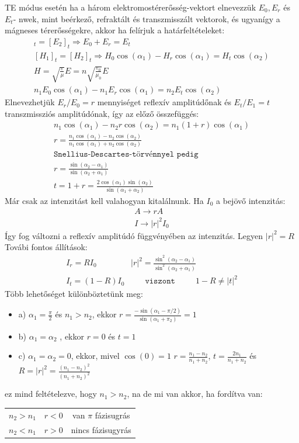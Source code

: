\documentclass{article}
\begin{document}
TE módus esetén ha a három elektromostérerősség-vektort elnevezzük $E_0, E_r$ és $E_t$- nwek, mint beérkező, refraktált és transzmisszált vektorok, és ugyanígy a mágneses térerősségekre, akkor ha felírjuk a határfeltételeket:
\begin{gather*}
[E_1]_t = [E_2]_t \Rightarrow E_0 + E_r = E_t \\
[H_1]_t = [H_2]_t \Rightarrow H_0 \cos(\alpha_1) - H_r \cos(\alpha_1) = H_t \cos(\alpha_2) \\
H=\sqrt{\frac{\varepsilon}{\mu}}E = n\sqrt{\frac{\varepsilon_0}{\mu_0}}E \\
n_1 E_0 \cos(\alpha_1) - n_1 E_r \cos(\alpha_1) = n_2 E_t \cos(\alpha_2)
\end{gather*}
Elnevezhetjük $E_r/E_0 = r$ mennyiséget reflexív amplitúdőnak és $E_t/E_1 = t$ transzmissziós amplitúdónak, így az előző összefüggés:
\begin{gather*}
n_1 \cos(\alpha_1) - n_2 r \cos(\alpha_2) = n_1(1+r)\cos(\alpha_1) \\
r= \frac{n_1 \cos(\alpha_1) - n_2 \cos(\alpha_2)}{n_1 \cos(\alpha_1) + n_2 \cos(\alpha_2)} \\ \texttt{Snellius-Descartes-törvénnyel pedig} \\
r=\frac{\sin(\alpha_2 - \alpha_1)}{\sin(\alpha_2 + \alpha_1)}  \\
t=1+r = \frac{2\cos(\alpha_1)\sin(\alpha_2)}{\sin(\alpha_1 + \alpha_2)}
\end{gather*}
Már csak az intenzitást kell valahogyan kitalálnunk. Ha $I_0$ a bejövő intenzitás:
\begin{gather*}
A\rightarrow rA \\
I\rightarrow |r|^2 I_0
\end{gather*}
Így fog változni a reflexív amplitúdó függvényében az intenzitás. Legyen $|r|^2 = R$ Továbi fontos állítások:
\begin{gather*}
I_r = RI_0 \hspace{50pt} |r|^2 = \frac{\sin^2(\alpha_2-\alpha_1)}{\sin^2(\alpha_2+\alpha_1)} \\
I_t = (1-R)I_0 \hspace{30pt} \texttt{viszont} \hspace{30pt} 1-R \neq |t|^2
\end{gather*}
Több lehetőséget különböztetünk meg:
\begin{itemize}
\item a) $\alpha_1 = \frac{\pi}{2}$ és $n_1> n_2$, ekkor $r=\frac{-\sin(\alpha_1-\pi/2)}{\sin(\alpha_1+\pi_2)} = 1$
\item b) $\alpha_1 = \alpha_2$ , ekkor $r=0$ és $t=1$
\item c) $\alpha_1 = \alpha_2 = 0$, ekkor, mivel $\cos(0)=1$ $r = \frac{n_1-n_2}{n_1+n_2}$, $t=\frac{2n_1}{n_1+n_2}$ és $R=|r|^2 = \frac{(n_1-n_2)^2}{(n_1+n_2)^2}$
\end{itemize}
ez mind feltételezve, hogy $n_1>n_2$, na de mi van akkor, ha fordítva van:
\begin{center}
\begin{tabular}{|c|c|c|}
$n_2>n_1$ & $r<0$ & van $\pi$ fázisugrás \\
$n_2<n_1$ & $r>0$ & nincs fázisugyrás
\end{tabular}
\end{center}
\end{document}
